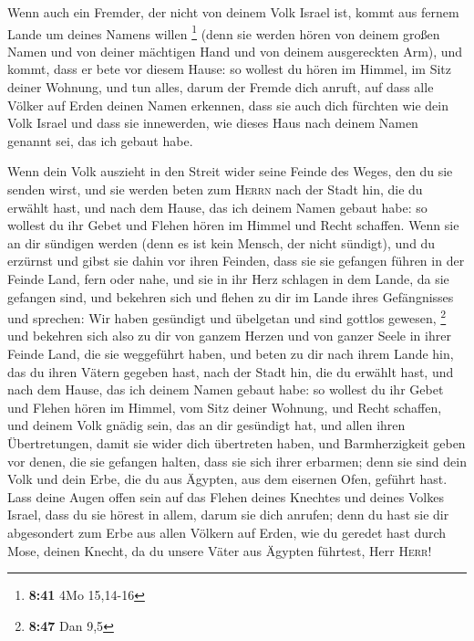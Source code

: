  Wenn auch ein Fremder, der nicht von deinem Volk Israel
ist, kommt aus fernem Lande um deines Namens willen \footnote{\textbf{8:41}
  4Mo 15,14-16}  (denn sie werden hören von deinem großen
Namen und von deiner mächtigen Hand und von deinem ausgereckten Arm),
und kommt, dass er bete vor diesem Hause:  so wollest du
hören im Himmel, im Sitz deiner Wohnung, und tun alles, darum der Fremde
dich anruft, auf dass alle Völker auf Erden deinen Namen erkennen, dass
sie auch dich fürchten wie dein Volk Israel und dass sie innewerden, wie
dieses Haus nach deinem Namen genannt sei, das ich gebaut habe.

 Wenn dein Volk auszieht in den Streit wider seine Feinde
des Weges, den du sie senden wirst, und sie werden beten zum
\textsc{Herrn} nach der Stadt hin, die du erwählt hast, und nach dem
Hause, das ich deinem Namen gebaut habe:  so wollest du
ihr Gebet und Flehen hören im Himmel und Recht schaffen. 
Wenn sie an dir sündigen werden (denn es ist kein Mensch, der nicht
sündigt), und du erzürnst und gibst sie dahin vor ihren Feinden, dass
sie sie gefangen führen in der Feinde Land, fern oder nahe,
 und sie in ihr Herz schlagen in dem Lande, da sie
gefangen sind, und bekehren sich und flehen zu dir im Lande ihres
Gefängnisses und sprechen: Wir haben gesündigt und übelgetan und sind
gottlos gewesen, \footnote{\textbf{8:47} Dan 9,5}  und
bekehren sich also zu dir von ganzem Herzen und von ganzer Seele in
ihrer Feinde Land, die sie weggeführt haben, und beten zu dir nach ihrem
Lande hin, das du ihren Vätern gegeben hast, nach der Stadt hin, die du
erwählt hast, und nach dem Hause, das ich deinem Namen gebaut habe:
 so wollest du ihr Gebet und Flehen hören im Himmel, vom
Sitz deiner Wohnung, und Recht schaffen,  und deinem Volk
gnädig sein, das an dir gesündigt hat, und allen ihren Übertretungen,
damit sie wider dich übertreten haben, und Barmherzigkeit geben vor
denen, die sie gefangen halten, dass sie sich ihrer erbarmen;
 denn sie sind dein Volk und dein Erbe, die du aus
Ägypten, aus dem eisernen Ofen, geführt hast.  Lass deine
Augen offen sein auf das Flehen deines Knechtes und deines Volkes
Israel, dass du sie hörest in allem, darum sie dich anrufen;
 denn du hast sie dir abgesondert zum Erbe aus allen
Völkern auf Erden, wie du geredet hast durch Mose, deinen Knecht, da du
unsere Väter aus Ägypten führtest, Herr \textsc{Herr}!

